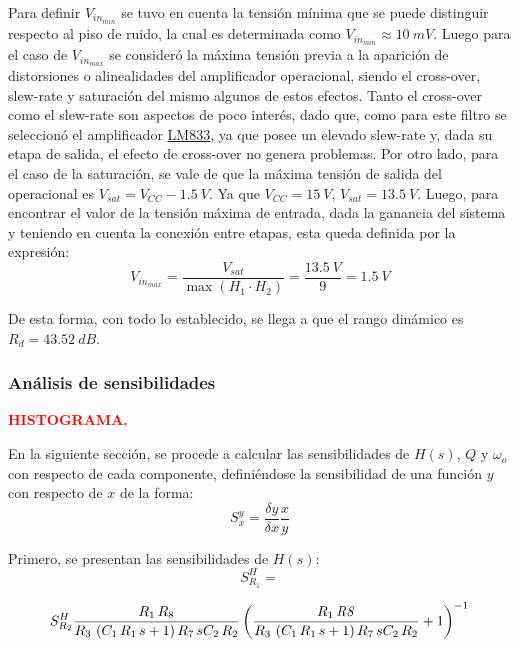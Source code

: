 Para definir $V_{in_{min}}$ se tuvo en cuenta la tensión mínima que se puede distinguir respecto al piso de ruido, la cual es determinada como $V_{in_{min}} \approx 10 \ mV$. Luego para el caso de $V_{in_{max}}$ se consideró la máxima tensión previa a la aparición de distorsiones o alinealidades del amplificador operacional, siendo el cross-over, slew-rate y saturación del mismo algunos de estos efectos. Tanto el cross-over como el slew-rate son aspectos de poco interés, dado que, como para este filtro se seleccionó el amplificador \href{http://www.ti.com/lit/ds/symlink/lm833-n.pdf}{LM833}, ya que posee un elevado slew-rate y, dada su etapa de salida, el efecto de cross-over no genera problemas. Por otro lado, para el caso de la saturación, se vale de que la máxima tensión de salida del operacional es $V_{sat} = V_{CC} - 1.5 \ V$. Ya que $V_{CC} = 15 \ V$, $V_{sat} = 13.5 \ V$. Luego, para encontrar el valor de la tensión máxima de entrada, dada la ganancia del sistema y teniendo en cuenta la conexión entre etapas, esta queda definida por la expresión:
\begin{equation}
	V_{in_{max}}=\frac{V_{sat}}{  \max(H_{1} \cdot H_{2} )} = \frac{13.5 \ V}{9} = 1.5 \ V
\end{equation}

De esta forma, con todo lo establecido, se llega a que el rango dinámico es $R_d = 43.52 \ dB$.

\subsubsection{Análisis de sensibilidades}
\begin{center}
	\Large{\textbf{\textcolor{red}{HISTOGRAMA.}}}
\end{center}

En la siguiente sección, se procede a calcular las sensibilidades de $H(s)$, $Q$ y $\omega_o$ con respecto de cada componente, definiéndose la sensibilidad de una función $y$ con respecto de $x$ de la forma:
\begin{equation*}
	S_{x}^{y} = \frac{\delta y}{\delta x} \frac{x}{y}
\end{equation*}

Primero, se presentan las sensibilidades de $H\left(s \right)$:
\begin{equation}
S_{R_1}^{H} = 
\end{equation}

\begin{equation}
S_{R_2}^{H}	{\frac {{R_1}\,{R_8}}{{R_3}\, \left( {C_1}\,{R_1}\,s+1
 \right) {R_7}\,s{C_2}\,{R_2}} \left( {\frac {{R_1}\,{\it 
R8}}{{R_3}\, \left( {C_1}\,{R_1}\,s+1 \right) {R_7}\,s{
C_2}\,{R_2}}}+1 \right) ^{-1}}
\end{equation}

